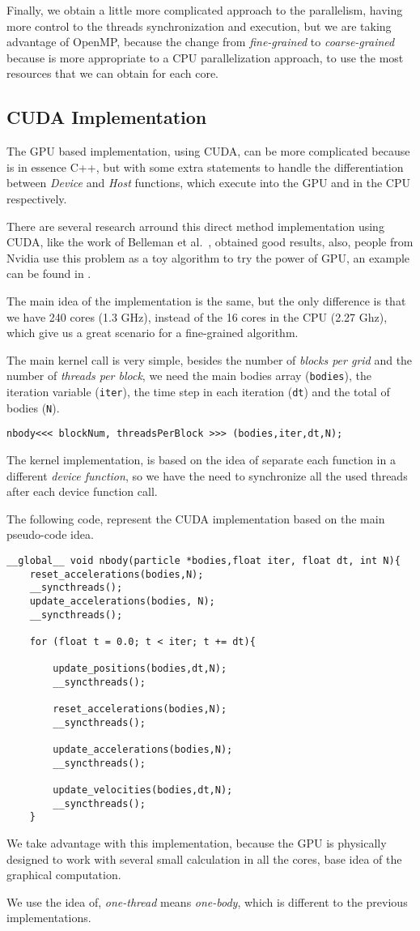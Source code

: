 Finally, we obtain a little more complicated approach to the parallelism,
having more control to the threads synchronization and execution,
but we are taking advantage of OpenMP, because the change from
\emph{fine-grained} to \emph{coarse-grained} because is more appropriate
to a CPU parallelization approach, to use the most resources that
we can obtain for each core.

\subsection{CUDA Implementation}

The GPU based implementation, using CUDA,
can be more complicated because is in essence C++,
but with some extra statements to handle the
differentiation between \emph{Device} and \emph{Host} functions,
which execute into the GPU and in the CPU respectively.

There are several research arround this direct method implementation
using CUDA, like the work of Belleman et al.~\cite{cuda1},
obtained good results, also, people from Nvidia
use this problem as a toy algorithm to try the power of GPU,
an example can be found in \cite{cuda2}.

The main idea of the implementation is the same,
but the only difference is that we have 240 cores (1.3 GHz),
instead of the 16 cores in the CPU (2.27 Ghz),
which give us a great scenario for a fine-grained algorithm.

The main kernel call is very simple,
besides the number of \emph{blocks per grid}
and the number of \emph{threads per block},
we need the main bodies array (\texttt{bodies}), the iteration variable (\texttt{iter}),
the time step in each iteration (\texttt{dt}) and the total of bodies (\texttt{N}). 

\begin{lstlisting}[style=C]
 nbody<<< blockNum, threadsPerBlock >>> (bodies,iter,dt,N);
\end{lstlisting}

The kernel implementation,
is based on the idea of separate each function
in a different \emph{device function},
so we have the need to synchronize all the used
threads after each device function call.

The following code, represent the CUDA implementation
based on the main pseudo-code idea.

\begin{lstlisting}[style=C]
__global__ void nbody(particle *bodies,float iter, float dt, int N){
    reset_accelerations(bodies,N);
    __syncthreads();
    update_accelerations(bodies, N);
    __syncthreads();
    
    for (float t = 0.0; t < iter; t += dt){
    
        update_positions(bodies,dt,N);
        __syncthreads();

        reset_accelerations(bodies,N);
        __syncthreads();

        update_accelerations(bodies,N);
        __syncthreads();
    
        update_velocities(bodies,dt,N);
        __syncthreads();
    }
\end{lstlisting}

We take advantage with this implementation,
because the GPU is physically designed
to work with several small calculation
in all the cores, base idea of the graphical
computation.

We use the idea of, \emph{one-thread}
means \emph{one-body}, which is different
to the previous implementations.
